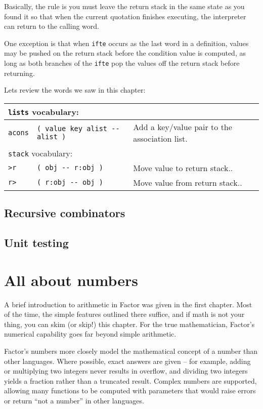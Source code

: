 \documentclass[english]{book}
\newcommand{\wordtable}[1]{{
\begin{tabularx}{12cm}{|l l X|}
#1
\hline
\end{tabularx}}}
\newcommand{\tabvocab}[1]{
\hline
\multicolumn{3}{|l|}{
\rule[-2mm]{0mm}{6mm}
\texttt{#1} vocabulary:}
\\
\hline
}
\begin{document}
Basically, the rule is you must leave the return stack in the same state as you found it so that when the current quotation finishes executing, the interpreter can return to the calling word.

One exception is that when \texttt{ifte} occurs as the last word in a definition, values may be pushed on the return stack before the condition value is computed, as long as both branches of the \texttt{ifte} pop the values off the return stack before returning.

Lets review the words we saw in this chapter:

\wordtable{
\tabvocab{lists}
\texttt{acons}&
\texttt{( value key alist -{}- alist )}&
Add a key/value pair to the association list.\\
\tabvocab{stack}
\texttt{>r}&
\texttt{( obj -{}- r:obj )}&
Move value to return stack..\\
\texttt{r>}&
\texttt{( r:obj -{}- obj )}&
Move value from return stack..\\
}

\section{Recursive combinators}

\section{Unit testing}

\chapter{All about numbers}

A brief introduction to arithmetic in Factor was given in the first chapter. Most of the time, the simple features outlined there suffice, and if math is not your thing, you can skim (or skip!) this chapter. For the true mathematician, Factor's numerical capability goes far beyond simple arithmetic.

Factor's numbers more closely model the mathematical concept of a number than other languages. Where possible, exact answers are given -- for example, adding or multiplying two integers never results in overflow, and dividing two integers yields a fraction rather than a truncated result. Complex numbers are supported, allowing many functions to be computed with parameters that would raise errors or return ``not a number'' in other languages.
\end{document}
